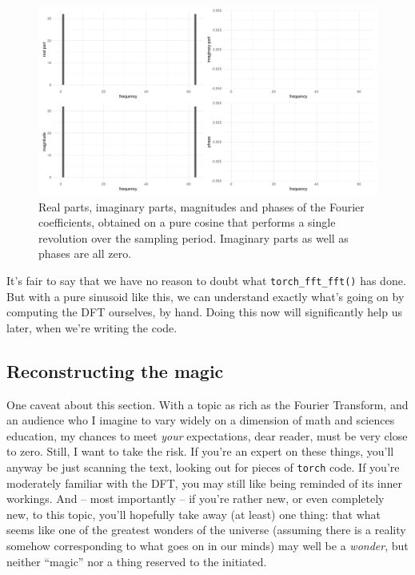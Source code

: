 \documentclass[
  letterpaper,
]{krantz}
\begin{document}
\begin{figure}[H]

{\centering \includegraphics{images/dft-cos-1-rev-dft.png}

}

\caption{\label{fig-dft-cos-1-rev-dft}Real parts, imaginary parts,
magnitudes and phases of the Fourier coefficients, obtained on a pure
cosine that performs a single revolution over the sampling period.
Imaginary parts as well as phases are all zero.}

\end{figure}

It's fair to say that we have no reason to doubt what
\texttt{torch\_fft\_fft()} has done. But with a pure sinusoid like this,
we can understand exactly what's going on by computing the DFT
ourselves, by hand. Doing this now will significantly help us later,
when we're writing the code.

\hypertarget{reconstructing-the-magic}{%
\subsection{Reconstructing the magic}\label{reconstructing-the-magic}}

One caveat about this section. With a topic as rich as the Fourier
Transform, and an audience who I imagine to vary widely on a dimension
of math and sciences education, my chances to meet \emph{your}
expectations, dear reader, must be very close to zero. Still, I want to
take the risk. If you're an expert on these things, you'll anyway be
just scanning the text, looking out for pieces of \texttt{torch} code.
If you're moderately familiar with the DFT, you may still like being
reminded of its inner workings. And -- most importantly -- if you're
rather new, or even completely new, to this topic, you'll hopefully take
away (at least) one thing: that what seems like one of the greatest
wonders of the universe (assuming there is a reality somehow
corresponding to what goes on in our minds) may well be a \emph{wonder},
but neither ``magic'' nor a thing reserved to the initiated.
\end{document}
